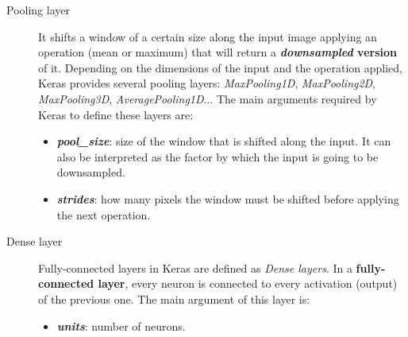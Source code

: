 \begin{description}
	\item[{Pooling layer}] It shifts a window of a certain size along the input image applying an operation (mean or maximum) that will return a \textbf{\textit{downsampled} version} of it. Depending on the dimensions of the input and the operation applied, Keras provides several pooling layers: \textit{MaxPooling1D}, \textit{MaxPooling2D}, \textit{MaxPooling3D}, \textit{AveragePooling1D}... The main arguments required by Keras to define these layers are:
	\begin{itemize}
		\item \textbf{\textit{pool\_size}}: size of the window that is shifted along the input. It can also be interpreted as the factor by which the input is going to be downsampled.
		\item \textbf{\textit{strides}}: how many pixels the window must be shifted before applying the next operation.
	\end{itemize}
\end{description}

\begin{description}
	\item[Dense layer] Fully-connected layers in Keras are defined as \textit{Dense layers}. In a \textbf{fully-connected layer}, every neuron is connected to every activation (output) of the previous one. The main argument of this layer is:
	\begin{itemize}
		\item \textbf{\textit{units}}: number of neurons.
	\end{itemize} 
\end{description}

